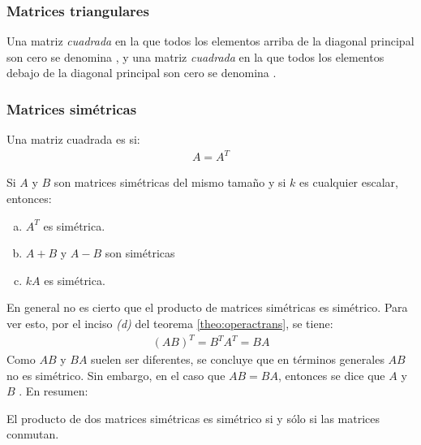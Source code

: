 \documentclass[a4paper,12pt]{article}
\begin{document}
\subsubsection{Matrices triangulares}

\begin{concept}
  Una matriz \emph{cuadrada} en la que todos los elementos arriba de la
  diagonal principal son cero se denomina , y una
  matriz \emph{cuadrada} en la que todos los elementos debajo de la
  diagonal principal son cero se denomina .
\end{concept}

\subsubsection{Matrices simétricas}

\begin{concept}[i]
  Una matriz cuadrada es  si:
  \begin{align*}
    A=A^T
  \end{align*}
\end{concept}

\begin{theorem}
  Si $A$ y $B$ son matrices simétricas del mismo tamaño y si $k$ es cualquier
  escalar, entonces:
  \begin{enumerate}[(a)]
    \item $A^T$ es simétrica.
    \item $A+B$ y $A-B$ son simétricas
    \item $kA$ es simétrica.
  \end{enumerate}
  \label{theo:simetmat}
\end{theorem}

\obse En general no es cierto que el producto de matrices simétricas es
simétrico. Para ver esto, por el inciso \emph{(d)} del teorema
\ref{theo:operactrans}, se tiene:
\begin{align*}
  (AB)^T=B^TA^T=BA
\end{align*}
Como $AB$ y $BA$ suelen ser diferentes, se concluye que en términos generales
$AB$ no es simétrico. Sin embargo, en el caso que $AB=BA$, entonces se dice
que $A$ y $B$ . En resumen:
\begin{concept}[i]
  El producto de dos matrices simétricas es simétrico si y sólo si las
  matrices conmutan.
\end{concept}
\end{document}
